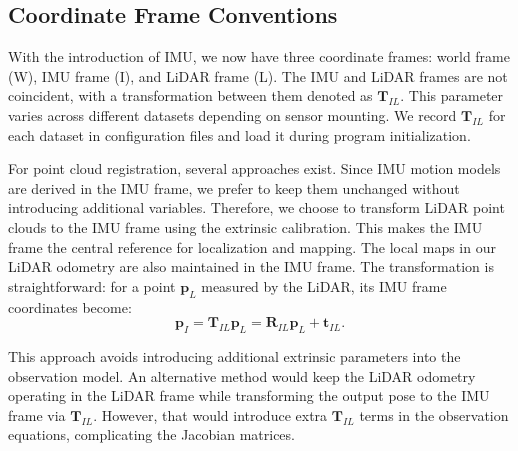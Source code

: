 \subsection{Coordinate Frame Conventions}
With the introduction of IMU, we now have three coordinate frames: world frame (W), IMU frame (I), and LiDAR frame (L). The IMU and LiDAR frames are not coincident, with a transformation between them denoted as $\mathbf{T}_{IL}$. This parameter varies across different datasets depending on sensor mounting. We record $\mathbf{T}_{IL}$ for each dataset in configuration files and load it during program initialization.

For point cloud registration, several approaches exist. Since IMU motion models are derived in the IMU frame, we prefer to keep them unchanged without introducing additional variables. Therefore, we choose to transform LiDAR point clouds to the IMU frame using the extrinsic calibration. This makes the IMU frame the central reference for localization and mapping. The local maps in our LiDAR odometry are also maintained in the IMU frame. The transformation is straightforward: for a point $\mathbf{p}_L$ measured by the LiDAR, its IMU frame coordinates become:
\begin{equation}\label{key}
	\mathbf{p}_{I} = \mathbf{T}_{IL} \mathbf{p}_L = \mathbf{R}_{IL} \mathbf{p}_L + \mathbf{t}_{IL}.
\end{equation}

This approach avoids introducing additional extrinsic parameters into the observation model. An alternative method would keep the LiDAR odometry operating in the LiDAR frame while transforming the output pose to the IMU frame via $\mathbf{T}_{IL}$. However, that would introduce extra $\mathbf{T}_{IL}$ terms in the observation equations, complicating the Jacobian matrices.

